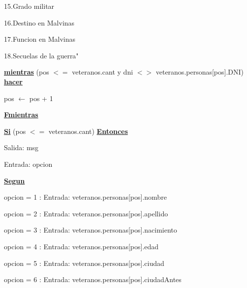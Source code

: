 \documentclass{article}
\begin{document}
                \hspace{25mm}15.Grado militar

                \hspace{25mm}16.Destino en Malvinas

                \hspace{25mm}17.Funcion en Malvinas

                \hspace{25mm}18.Secuelas de la guerra"

            \hspace{12mm}\underline{\textbf{mientras}} (pos $<=$ veteranos.cant y dni $<>$ veteranos.personas[pos].DNI) \underline{\textbf{hacer}}

                \hspace{16mm}pos $\leftarrow$ pos + 1

            \hspace{12mm}\underline{\textbf{Fmientras}}

            \hspace{12mm}\underline{\textbf{Si}} (pos $<=$ veteranos.cant) \underline{\textbf{Entonces}}

                \hspace{16mm} Salida: msg

                \hspace{16mm}Entrada: opcion

                \hspace{16mm}\underline{\textbf{Segun}}

                    \hspace{20mm}opcion = 1 : Entrada: veteranos.personas[pos].nombre

                    \hspace{20mm}opcion = 2 : Entrada: veteranos.personas[pos].apellido
                    
                    \hspace{20mm}opcion = 3 : Entrada: veteranos.personas[pos].nacimiento
                    
                    \hspace{20mm}opcion = 4 : Entrada: veteranos.personas[pos].edad
                    
                    \hspace{20mm}opcion = 5 : Entrada: veteranos.personas[pos].ciudad
                    
                    \hspace{20mm}opcion = 6 : Entrada: veteranos.personas[pos].ciudadAntes
\end{document}
